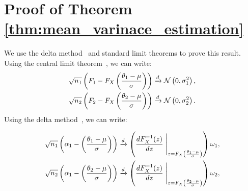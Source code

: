\documentclass[10pt]{article} %
\theoremstyle{plain}
\theoremstyle{definition}
\theoremstyle{remark}
\newcommand{\cN}{\mathcal N}
\begin{document}



\appendix

\section{Proof of Theorem \ref{thm:mean_varinace_estimation}}\label{sec:prf_nonadaptive_estimator}
We use the delta method~\citep[Theorem 5.5.24]{casella2002statistical} and standard limit theorems to prove this result. Using the central limit theorem~\cite[Theorem 5.5.14]{casella2002statistical}, we can write:
\begin{equation}
\begin{aligned}
    \sqrt{n_1} \left( F_1 - F_X \left(\frac{\theta_1 - \mu}{\sigma}\right)\right) \xrightarrow{d} \cN \left(0, \sigma_{1}^{2}  \right), \\
  \sqrt{n_2} \left(F_2 - F_X\left(\frac{\theta_2 - \mu}{\sigma}\right)\right) \xrightarrow{d} \cN \left(0, \sigma_{2}^{2}  \right).    \notag
\end{aligned}
\end{equation}
Using the delta method~\cite[Theorem 5.5.24]{casella2002statistical}, we can write:

\begin{equation}\label{eq:alphaandalpha2converse1}
\begin{aligned}
    \sqrt{n_1} \left( \alpha_1 - \left(\frac{\theta_1 - \mu}{\sigma}\right)\right) & \xrightarrow{d} \left( \frac{d F_{X}^{-1}(z)}{dz} \Biggm|_{z = F_{X}\left (\frac{\theta_1 - \mu}{\sigma} \right)} \right)  \omega_1,  \\ 
    \sqrt{n_2} \left( \alpha_1 - \left(\frac{\theta_2 - \mu}{\sigma} \right)\right) & \xrightarrow{d} \left(  \frac{d F_{X}^{-1}(z)}{dz} \Biggm|_{z = F_{X} 
\left( \frac{\theta_2 - \mu}{\sigma}\right) } \right) \omega_2, 
\end{aligned}
\end{equation}
\end{document}
